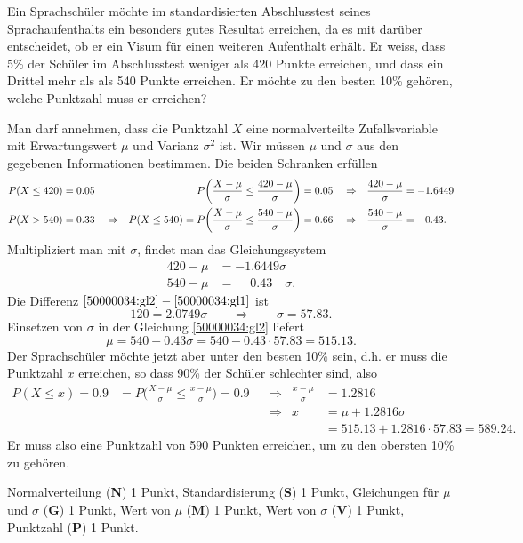 Ein Sprachschüler möchte im standardisierten Abschlusstest seines
Sprachaufenthalts
ein besonders gutes Resultat erreichen, da es mit darüber entscheidet,
ob er ein Visum für einen weiteren Aufenthalt erhält.
Er weiss, dass 5\% der Schüler im Abschlusstest weniger als 420 Punkte
erreichen, und dass ein Drittel mehr als als 540 Punkte erreichen.
Er möchte zu den besten 10\% gehören, welche Punktzahl muss
er erreichen?


\begin{loesung}
Man darf annehmen, dass die Punktzahl $X$ eine normalverteilte
Zufallsvariable mit Erwartungswert $\mu$ und Varianz $\sigma^2$ ist.
Wir müssen $\mu$ und $\sigma$ aus den gegebenen Informationen bestimmen.
Die beiden Schranken erfüllen
\begin{align*}
P(X\le 420)&= 0.05
&
&%
&
&\hspace{-10pt}&
P\biggl(\frac{X-\mu}{\sigma}\le \frac{420-\mu}{\sigma}\biggr)
&=
0.05
&&\Rightarrow
&
\frac{420-\mu}{\sigma}
&=
-1.6449
\\
P(X> 540)&=0.33
&
&\Rightarrow
&
P(X\le 540)=\mathstrut
&\hspace{-10pt}&
P\biggl(\frac{X-\mu}{\sigma}\le \frac{540-\mu}{\sigma}\biggr)
&=
0.66
&&\Rightarrow&
\frac{540-\mu}{\sigma}
&=
\phantom{-}
0.43.
\end{align*}
Multipliziert man mit $\sigma$, findet man das Gleichungssystem
\begin{align}
420-\mu&=-1.6449\sigma
\label{50000034:gl1}
\\
540-\mu&=\phantom{-}0.43\phantom{00}\sigma.
\label{50000034:gl2}
\end{align}
Die Differenz
$
\eqref{50000034:gl2}
-
\eqref{50000034:gl1}
$
ist
\[
120=2.0749\sigma
\qquad\Rightarrow\qquad
\sigma=57.83.
\]
Einsetzen von $\sigma$ in der Gleichung
\eqref{50000034:gl2}
liefert
\[
\mu=540-0.43\sigma=540-0.43\cdot 57.83=515.13.
\]
Der Sprachschüler möchte jetzt aber unter den besten 10\% sein, d.h. er
muss die Punktzahl $x$ erreichen, so dass 90\% der Schüler schlechter sind,
also
\begin{align*}
P(X\le x)=0.9
&=
P\biggl(\frac{X-\mu}{\sigma}\le \frac{x-\mu}{\sigma}\biggr)=0.9
&&\Rightarrow&
\frac{x-\mu}{\sigma} &= 1.2816
\\
&
&&\Rightarrow&
x &= \mu+1.2816\sigma
\\
&&&&
  &=515.13 + 1.2816\cdot 57.83=589.24.
\end{align*}
Er muss also eine Punktzahl von 590 Punkten erreichen, um zu den
obersten 10\% zu gehören.
\end{loesung}

\begin{bewertung}
Normalverteilung ({\bf N}) 1 Punkt,
Standardisierung ({\bf S}) 1 Punkt,
Gleichungen für $\mu$ und $\sigma$ ({\bf G}) 1 Punkt,
Wert von $\mu$ ({\bf M}) 1 Punkt,
Wert von $\sigma$ ({\bf V}) 1 Punkt,
Punktzahl ({\bf P}) 1 Punkt.
\end{bewertung}


